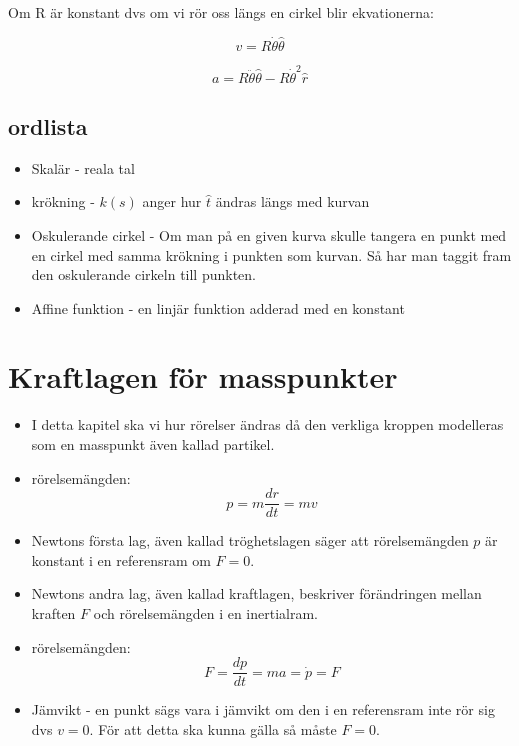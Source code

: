 \documentclass[a4paper,12pt]{article}
\begin{document}
Om R är konstant dvs om vi rör oss längs en cirkel blir ekvationerna:

\begin{equation}
v = R\dot{\theta}\hat{\theta}
\end{equation}

\begin{equation}
a = R\ddot{\theta}\hat{\theta}-R\dot{\theta}^2\hat{r}
\end{equation}


\subsection{ordlista}

\begin{itemize}

  \item  Skalär - reala tal

  \item  krökning - $k(s)$ anger hur $\hat{t}$ ändras längs med kurvan

  \item  Oskulerande cirkel -  Om man på en given kurva skulle tangera 
         en punkt med en cirkel med samma krökning i punkten som kurvan.
         Så har man taggit fram den oskulerande cirkeln till punkten.

  \item Affine funktion - en linjär funktion adderad med en konstant

\end{itemize}

\section{Kraftlagen för masspunkter}
\begin{itemize}

\item I detta kapitel ska vi hur rörelser ändras då den verkliga kroppen modelleras som en masspunkt även kallad partikel. 

\item rörelsemängden:
\begin{equation}
p = m\frac{dr}{dt}=mv
\end{equation}

\item Newtons första lag, även kallad tröghetslagen säger att rörelsemängden $p$ är konstant i en referensram om $F=0$.

\item Newtons andra lag, även kallad kraftlagen, beskriver förändringen mellan kraften $F$ och rörelsemängden i en inertialram.

\item rörelsemängden:
\begin{equation}
F = \frac{dp}{dt} = ma = \dot{p}=F
\end{equation}

\item Jämvikt - en punkt sägs vara i jämvikt om den i en referensram inte rör sig dvs $v=0$. För att detta ska kunna gälla så måste $F=0$.

\end{itemize}
\end{document}
